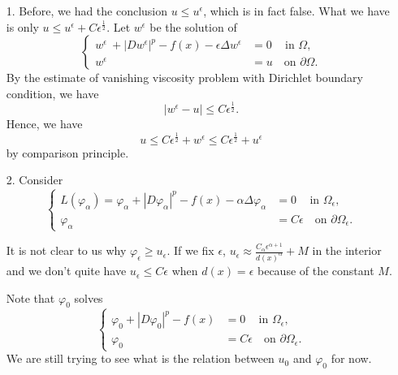 \documentclass[english,reqno]{amsart}
\begin{document}
\begin{itemize}
    \item[1.] Before, we had the conclusion $ u \leq u^\epsilon$, which is in fact false. What we have is only $u \leq u^\epsilon +C\epsilon^\frac{1}{2}$. Let $w^\epsilon$ be the solution of 
    \begin{equation}
\left\{
  \begin{aligned}
     w^\epsilon\ + |Dw^\epsilon|^p -f(x) - \epsilon \Delta w^\epsilon  &=0 \quad \, \text{in } \Omega, \\
   w^\epsilon &= u \quad \text{on } \partial \Omega.
  \end{aligned}
\right.
\end{equation} 
By the estimate of vanishing viscosity problem with Dirichlet boundary condition, we have \begin{equation}
    |w^\epsilon - u| \leq C \epsilon ^\frac{1}{2}.
\end{equation}
Hence, we have 
\begin{equation}
    u \leq C\epsilon^\frac{1}{2}+w^\epsilon\leq C\epsilon^\frac{1}{2} + u^\epsilon
\end{equation}
by comparison principle.

\bigbreak
\bigbreak


\item[2.] Consider
\begin{equation}
\left\{
  \begin{aligned}
    L(\varphi_\alpha) = \varphi_\alpha + |D\varphi_\alpha|^p -f(x) - \alpha \Delta \varphi_\alpha &=0 \quad \, \text{in } \Omega_\epsilon, \\
   \varphi_\alpha &= C\epsilon \quad \text{on } \partial \Omega_\epsilon.
  \end{aligned}
\right.
\end{equation}

It is not clear to us why $\varphi_\epsilon \geq u_\epsilon$. If we fix $\epsilon$, $\displaystyle u_\epsilon \approx \frac{C_\alpha \epsilon^{\alpha+1}}{d(x)^\alpha} +M $ in the interior and we don't quite have $u_\epsilon \leq C\epsilon$ when $d(x)=\epsilon$ because of the constant $M$.


Note that $\varphi_0$ solves
\begin{equation}
\label{vis}
\left\{
  \begin{aligned}
    \varphi_0 + |D\varphi_0|^p -f(x) &=0 \quad \, \text{in } \Omega_\epsilon, \\
             \varphi_0 &= C\epsilon \quad \text{on } \partial \Omega_\epsilon.
  \end{aligned}
\right.
\end{equation}
We are still trying to see what is the relation between $u_0$ and $\varphi_0$ for now.


\end{itemize}
\end{document}
